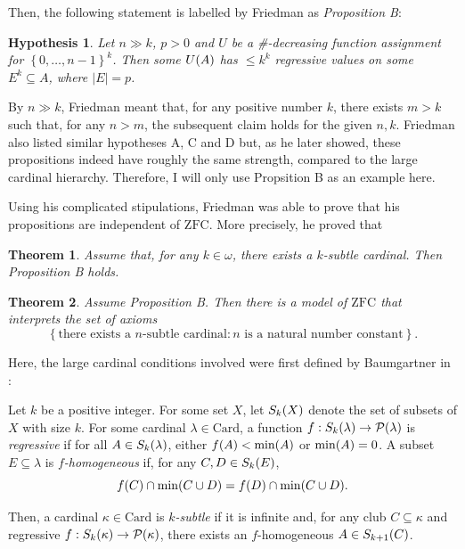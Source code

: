 \documentclass[12pt]{article}
\theoremstyle{plain}
\newtheorem{theorem}{Theorem}[section]
\newtheorem*{hypothesis*}{Hypothesis}
\theoremstyle{definition}
\newcommand{\ZFC}{\mathrm{ZFC}}
\newcommand{\Card}{\mathrm{Card}}
\begin{document}
Then, the following statement is labelled by Friedman as \emph{Proposition B}:

\begin{hypothesis*}
	Let $n \gg k$, $p > 0$ and $U$ be a \#-decreasing function assignment for $\left\{0, \ldots, n - 1\right\}^k$. Then some $U\mleft(A\mright)$ has $\leq k^k$ regressive values on some $E^k \subseteq A$, where $\left|E\right| = p$.
\end{hypothesis*}

By $n \gg k$, Friedman meant that, for any positive number $k$, there exists $m > k$ such that, for any $n > m$, the subsequent claim holds for the given $n, k$. Friedman also listed similar hypotheses A, C and D but, as he later showed, these propositions indeed have roughly the same strength, compared to the large cardinal hierarchy. Therefore, I will only use Propsition B as an example here.

Using his complicated stipulations, Friedman was able to prove that his propositions are independent of $\ZFC$. More precisely, he proved that

\begin{theorem}
	Assume that, for any $k \in \omega$, there exists a $k$-subtle cardinal. Then Proposition B holds.
\end{theorem}

\begin{theorem}
	\label{thm:friedman-proposition-equivalent-to-consistency-of-subtle-cardinals}
	Assume Proposition B. Then there is a model of $\ZFC$ that interprets the set of axioms
	\[\left\{\text{there exists a $n$-subtle cardinal} : \text{$n$ is a natural number constant}\right\}.\]
\end{theorem}

Here, the large cardinal conditions involved were first defined by Baumgartner in \cite{ineffable-cardinals}:

\begin{definition}
	Let $k$ be a positive integer. For some set $X$, let $S_k\mleft(X\mright)$ denote the set of subsets of $X$ with size $k$. For some cardinal $\lambda \in \Card$, a function $f : S_k\mleft(\lambda\mright) \rightarrow \mathcal{P}\mleft(\lambda\mright)$ is \emph{regressive} if for all $A \in S_k\mleft(\lambda\mright)$, either $f\mleft(A\mright) < \min\mleft(A\mright)$ or $\min\mleft(A\mright) = 0$. A subset $E \subseteq \lambda$ is \emph{$f$-homogeneous} if, for
	any $C, D \in S_k\mleft(E\mright)$,
	\[f\mleft(C\mright) \cap \min\mleft(C \cup D\mright) = f\mleft(D\mright) \cap \min\mleft(C \cup D\mright).\]

	Then, a cardinal $\kappa \in \Card$ is \emph{$k$-subtle} if it is infinite and, for any club $C \subseteq \kappa$ and regressive $f : S_k\mleft(\kappa\mright) \rightarrow \mathcal{P}\mleft(\kappa\mright)$, there exists an $f$-homogeneous $A \in S_{k + 1}\mleft(C\mright)$.
\end{definition}
\end{document}
